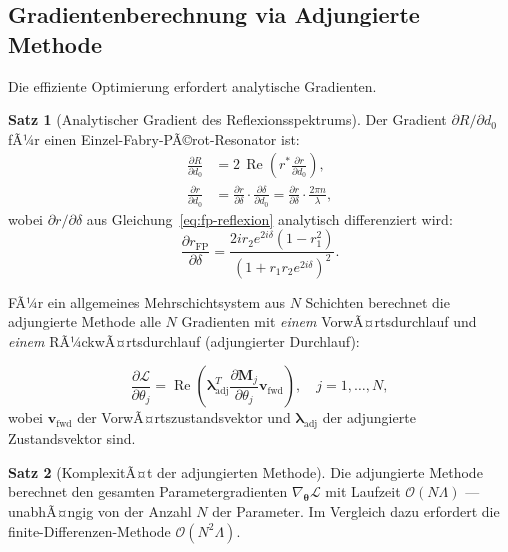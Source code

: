 ﻿\documentclass[a4paper,12pt]{article}
\theoremstyle{definition}
\newtheorem{satz}{Satz}[section]
\newcommand{\ordre}[1]{\mathcal{O}\!\left(#1\right)}
\newcommand{\Realteil}{\operatorname{Re}}
\newcommand{\vect}[1]{\bm{#1}}
\newcommand{\matr}[1]{\mathbf{#1}}
\begin{document}
	\subsection{Gradientenberechnung via Adjungierte Methode}
	
	Die effiziente Optimierung erfordert analytische Gradienten.
	
	\begin{satz}[Analytischer Gradient des Reflexionsspektrums]
		\label{satz:gradient}
		Der Gradient $\partial R/\partial d_0$ fÃ¼r einen Einzel-Fabry-PÃ©rot-Resonator ist:
		\begin{align}
			\frac{\partial R}{\partial d_0}
			&= 2\,\Realteil\!\left(r^* \frac{\partial r}{\partial d_0}\right),
			\label{eq:gradient-R}\\
			\frac{\partial r}{\partial d_0}
			&= \frac{\partial r}{\partial \delta} \cdot \frac{\partial \delta}{\partial d_0}
			= \frac{\partial r}{\partial \delta} \cdot \frac{2\pi n}{\lambda},
			\label{eq:gradient-r}
		\end{align}
		wobei $\partial r/\partial\delta$ aus Gleichung~\eqref{eq:fp-reflexion}
		analytisch differenziert wird:
		\begin{equation}
			\frac{\partial r_\mathrm{FP}}{\partial \delta}
			= \frac{2i r_2 e^{2i\delta}(1 - r_1^2)}
			{(1 + r_1 r_2 e^{2i\delta})^2}.
			\label{eq:dr-ddelta}
		\end{equation}
	\end{satz}
	
	FÃ¼r ein allgemeines Mehrschichtsystem aus $N$ Schichten berechnet die
	adjungierte Methode alle $N$ Gradienten mit \emph{einem} VorwÃ¤rtsdurchlauf
	und \emph{einem} RÃ¼ckwÃ¤rtsdurchlauf (adjungierter Durchlauf):
	
	\begin{equation}
		\frac{\partial \mathcal{L}}{\partial \theta_j} = \Realteil\!\left(
		\vect{\lambda}_\mathrm{adj}^T \frac{\partial \matr{M}_j}{\partial \theta_j} \vect{v}_\mathrm{fwd}
		\right), \quad j = 1,\ldots,N,
		\label{eq:adjoint}
	\end{equation}
	wobei $\vect{v}_\mathrm{fwd}$ der VorwÃ¤rtszustandsvektor und
	$\vect{\lambda}_\mathrm{adj}$ der adjungierte Zustandsvektor sind.
	
	\begin{satz}[KomplexitÃ¤t der adjungierten Methode]
		\label{satz:adjoint-komplex}
		Die adjungierte Methode berechnet den gesamten Parametergradienten
		$\nabla_{\vect{\theta}}\mathcal{L}$ mit Laufzeit $\ordre{N\Lambda}$ ---
		unabhÃ¤ngig von der Anzahl $N$ der Parameter. Im Vergleich dazu erfordert
		die finite-Differenzen-Methode $\ordre{N^2\Lambda}$.
	\end{satz}
	
\end{document}
